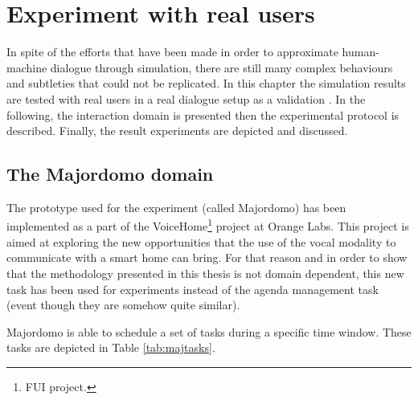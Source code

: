 \chapter{Experiment with real users}

\label{ch:experiment}

	In spite of the efforts that have been made in order to approximate human-machine dialogue through simulation, there are still many complex behaviours and subtleties that could not be replicated. In this chapter the simulation results are tested with real users in a real dialogue setup as a validation \cite{Khouzaimi2016b}. In the following, the interaction domain is presented then the experimental protocol is described. Finally, the result experiments are depicted and discussed.

\section{The Majordomo domain}

	The prototype used for the experiment (called Majordomo) has been implemented as a part of the VoiceHome\footnote{FUI project.} project at Orange Labs. This project is aimed at exploring the new opportunities that the use of the vocal modality to communicate with a smart home can bring. For that reason and in order to show that the methodology presented in this thesis is not domain dependent, this new task has been used for experiments instead of the agenda management task (event though they are somehow quite similar).
	
	Majordomo is able to schedule a set of tasks during a specific time window. These tasks are depicted in Table \ref{tab:majtasks}.

